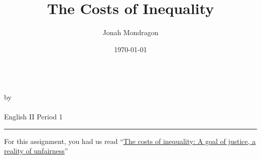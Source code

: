 \documentclass[12pt]{article}
\newcommand{\PutTitle}[1]
{
    \begin{center}
        {\huge\bfseries\thetitle}\\
        by \theauthor\\
        \thedate\\
        #1        
    \end{center}
    \hrule
    \vspace{2ex}
}
\begin{document}
\title{The Costs of Inequality}
\author{Jonah Mondragon}
\date{\today}
\PutTitle{English II Period 1}

\doublespacing

For this assignment, you had us read
``{\color{blue}\underline{\href{https://news.harvard.edu/gazette/story/2016/02/the-costs-of-inequality-a-goal-of-justice-a-reality-of-unfairness/kj}{The
costs of inequality: A goal of justice, a reality of unfairness}}}''
\end{document}
